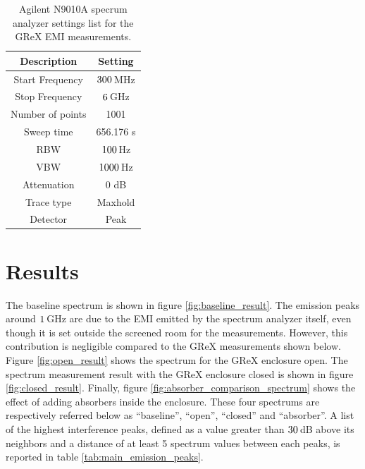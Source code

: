 \documentclass[12pt,a4paper,oneside]{article}
\begin{document}
\begin{table}[]
    \centering
   
    \begin{tabular}{|c|c|}
    \hline
         \cellcolor[gray]{0.85} Description & \cellcolor[gray]{0.85} Setting \\ \hline
          Start Frequency & $300\thinspace$MHz \\ \hline
          Stop Frequency & $6\thinspace$GHz \\ \hline
          Number of points & 1001 \\ \hline
          Sweep time & 656.176 s\\ \hline
          RBW & $100\thinspace$Hz \\ \hline
          VBW & $1000\thinspace$Hz \\ \hline
          Attenuation & 0 dB\\ \hline
          Trace type & Maxhold \\ \hline
          Detector & Peak \\ \hline         
    \end{tabular}
    \caption{ Agilent N9010A specrum analyzer settings list for the GReX EMI measurements.}
    \label{tab:spectrum_analyzer_settings}
\end{table}
\section{Results}
\label{sec:Results}

The baseline spectrum is shown in figure \ref{fig:baseline_result}. The emission peaks around $1\thinspace$GHz are due to the EMI emitted by the spectrum analyzer itself, even though it is set outside the screened room for the measurements. However, this contribution is negligible compared to the GReX measurements shown below. Figure \ref{fig:open_result} shows the spectrum for the GReX enclosure open. The spectrum measurement result with the GReX enclosure closed is shown in figure \ref{fig:closed_result}. Finally, figure \ref{fig:absorber_comparison_spectrum} shows the effect of adding absorbers inside the enclosure. These four spectrums are respectively referred below as ``baseline'', ``open'', ``closed'' and ``absorber''. A list of the highest interference peaks, defined as a value greater than $30\thinspace$dB above its neighbors and a distance of at least 5 spectrum values between each peaks, is reported in table \ref{tab:main_emission_peaks}.
\end{document}
